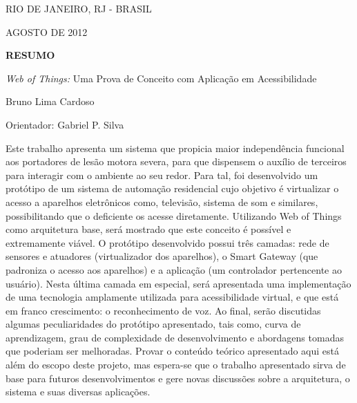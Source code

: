 \begin{titlepage}
\begin{center}

RIO DE JANEIRO, RJ - BRASIL

AGOSTO DE 2012

\end{center}

\bigskip

\clearpage
\bigskip

\begin{center}
\centerline{\textbf{\large RESUMO}}


\bigskip

\emph{Web of Things:} Uma Prova de Conceito com Aplicação em Acessibilidade


\bigskip

Bruno Lima Cardoso


\end{center}
\bigskip


\bigskip


Orientador: Gabriel P. Silva 


\bigskip


\bigskip

Este trabalho apresenta um sistema que propicia maior independência funcional aos portadores de lesão motora severa, para que dispensem o auxílio de terceiros para interagir com o ambiente ao seu redor. Para tal, foi desenvolvido um protótipo de um sistema de automação residencial cujo objetivo é virtualizar o acesso a aparelhos eletrônicos como, televisão, sistema de som e similares,  possibilitando que o deficiente os acesse diretamente. Utilizando Web of Things como arquitetura base, será mostrado que este conceito é possível e extremamente viável. O protótipo desenvolvido possui três camadas: rede de sensores e atuadores (virtualizador dos aparelhos), o Smart Gateway (que padroniza o acesso aos aparelhos) e a aplicação (um controlador pertencente ao usuário). Nesta última camada em especial, será apresentada uma implementação de uma tecnologia amplamente utilizada para acessibilidade virtual, e que está em franco crescimento: o reconhecimento de voz. Ao final, serão discutidas algumas peculiaridades do protótipo apresentado, tais como, curva de aprendizagem, grau de complexidade de desenvolvimento e abordagens tomadas que poderiam ser melhoradas. Provar o conteúdo teórico apresentado aqui está além do escopo deste projeto, mas espera-se que o trabalho apresentado sirva de base para futuros desenvolvimentos e gere novas discussões sobre a arquitetura, o sistema e suas diversas aplicações.


\end{titlepage}

